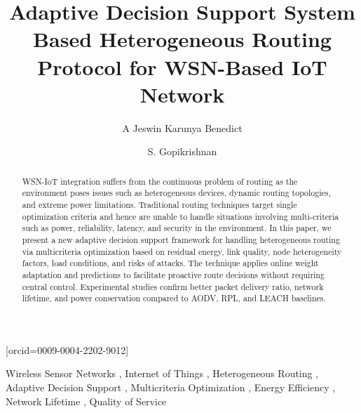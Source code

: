 \documentclass[a4paper,fleqn]{cas-dc}
\numberwithin{equation}{section}
\begin{document}
\hfuzz=150pt
\vfuzz=10pt
\let\WriteBookmarks\relax


\title[mode=title]{Adaptive Decision Support System Based Heterogeneous
Routing Protocol for WSN-Based IoT Network}

\author[1]{A Jeswin Karunya Benedict}[orcid=0009-0004-2202-9012]
\cormark[1]

\author[1]{S. Gopikrishnan}



\address[1]{School of Computer Science and Engineering,
VIT-AP University, Amaravati, Andhra Pradesh, India}



\begin{abstract}
WSN-IoT integration suffers from the continuous problem of
routing as the environment poses issues such as heterogeneous devices,
dynamic routing topologies, and extreme power limitations. Traditional
routing techniques target single optimization criteria and hence are
unable to handle situations involving multi-criteria such as
power, reliability, latency, and security in the environment.
In this paper, we present a new adaptive decision support
framework for handling heterogeneous routing via multicriteria
optimization based on residual energy, link quality, node
heterogeneity factors, load conditions, and risks of attacks.
The technique applies online weight adaptation and predictions to
facilitate proactive route decisions without requiring central control.
Experimental studies confirm better packet delivery ratio,
network lifetime, and power conservation compared to AODV,
RPL, and LEACH baselines.
\end{abstract}

\begin{keywords}
Wireless Sensor Networks \sep
Internet of Things \sep
Heterogeneous Routing \sep
Adaptive Decision Support \sep
Multicriteria Optimization \sep
Energy Efficiency \sep
Network Lifetime \sep
Quality of Service
\end{keywords}

\maketitle

\end{document}
